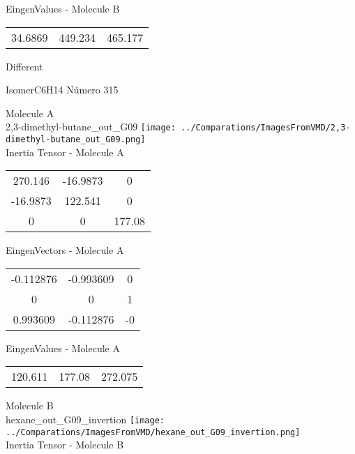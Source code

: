 \begin{multicols}{2}
\begin{center}
\vtab
 EingenValues - Molecule B     \\
\vtab
\begin{tabular}{|c c c|}
34.6869	 & 	449.234	 & 	465.177	 \\
\end{tabular}

\end{center}
\end{multicols}
\begin{center}
\vtab
\vtab
\textcolor{NavyBlue}{\Large Different}
\end{center}

 \newpage

\vtab[-2cm]
\begin{center}
{\large IsomerC6H14 \tab Número 315}
\end{center}
\begin{multicols}{2}
\begin{center}

Molecule A \\ 
2,3-dimethyl-butane\_out\_G09
\texttt{[image: ../Comparations/ImagesFromVMD/2,3-dimethyl-butane\_out\_G09.png]}
\\
Inertia Tensor - Molecule A \\
\vtab

\begin{tabular}{|c c c|}
270.146	 & 	-16.9873	 & 	0	 \\
-16.9873	 & 	122.541	 & 	0	 \\
0	 & 	0	 & 	177.08
\end{tabular}

\vtab
 EingenVectors - Molecule A     \\
\vtab
\begin{tabular}{|c c c|}
-0.112876	 & 	-0.993609	 & 	0	 \\
0	 & 	0	 & 	1	 \\
0.993609	 & 	-0.112876	 & 	-0
\end{tabular}

\vtab
 EingenValues - Molecule A     \\
\vtab
\begin{tabular}{|c c c|}
120.611	 & 	177.08	 & 	272.075	 \\
\end{tabular}
\columnbreak

Molecule B \\ 
hexane\_out\_G09\_invertion
\texttt{[image: ../Comparations/ImagesFromVMD/hexane\_out\_G09\_invertion.png]}
\\
Inertia Tensor - Molecule B \\
\vtab


\end{center}
\end{multicols}
